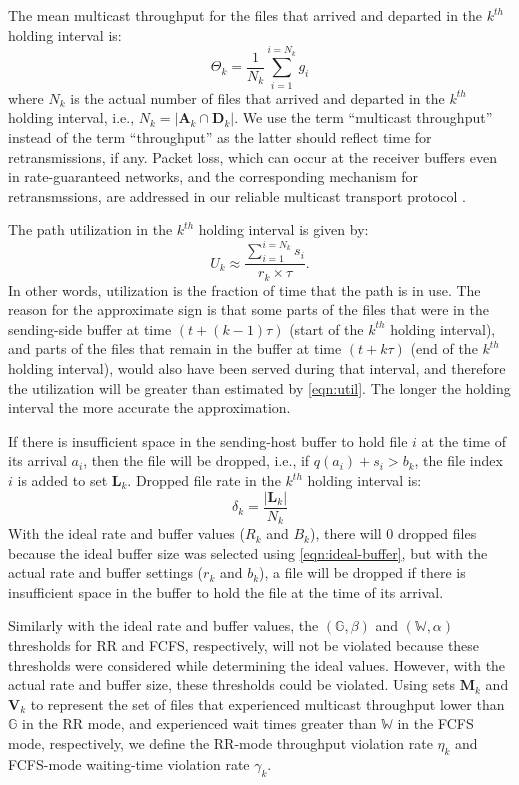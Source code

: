 The mean multicast throughput for the files that arrived and departed in the $k^{th}$ holding interval is:
\begin{equation}
\Theta_k = \frac{1}{N_k} \sum_{i=1}^{i=N_k} g_i
\end{equation}
where $N_k$ is the actual number of files that arrived and
departed in the $k^{th}$ holding interval, i.e.,
$N_k = \left\vert\textbf{A}_k \cap \textbf{D}_k\right\vert$.
We use the term ``multicast throughput'' instead of the term
``throughput'' as the latter should reflect time for retransmissions,
if any. Packet loss, which can occur at the receiver buffers
even in rate-guaranteed networks, and the corresponding mechanism for retransmssions, are addressed in our reliable multicast transport protocol \cite{FMTP}.

The path utilization in the $k^{th}$ holding interval is given by:
\begin{equation} \label{eqn:util}
U_k \approx \frac{\sum_{i=1}^{i=N_k} s_i}{r_k \times \tau}.
\end{equation}
In other words, utilization is the fraction of time that the path is in use. The reason for the approximate sign is that some parts of the files that were in the sending-side buffer at time $(t+(k-1)\tau)$ (start of the
$k^{th}$ holding interval), and parts of the files that remain in the buffer at time $(t+k\tau)$ (end of the $k^{th}$ holding interval),
would also have been served during
that interval, and therefore the utilization will be greater than
estimated by \eqref{eqn:util}. The longer the holding interval the more
accurate the approximation.

If there is insufficient space in the sending-host buffer to hold file $i$ at the time of its arrival $a_i$, then the file will be dropped, i.e., if
$q(a_i) + s_i > b_k$, the file index $i$ is added to set
$\textbf{L}_k$. Dropped file rate in the $k^{th}$ holding interval is:
\begin{equation}
\delta_k = \frac{\left\vert\textbf{L}_k\right\vert}{N_k}
\end{equation}
With the ideal rate and buffer values
($R_k$ and $B_k$), there will 0 dropped files because the ideal buffer size was selected using \eqref{eqn:ideal-buffer}, but with the actual rate and
buffer settings ($r_k$ and $b_k$), a file will be dropped if
there is insufficient space in the buffer to hold the file
at the time of its arrival.

Similarly with the ideal rate and buffer values, the $(\mathbb{G},\beta)$ and $(\mathbb{W},\alpha)$ thresholds for RR and FCFS, respectively,
will not be violated because these thresholds were considered while determining
the ideal values. However, with the actual rate and buffer size, these thresholds could be violated.
Using sets $\textbf{M}_k$ and $\textbf{V}_k$ to represent the
set of files that experienced multicast throughput lower than $\mathbb{G}$ in the RR mode, and experienced
wait times greater than $\mathbb{W}$ in the FCFS mode, respectively,
we define the RR-mode throughput
violation rate $\eta_k$ and FCFS-mode waiting-time violation rate $\gamma_k$.

